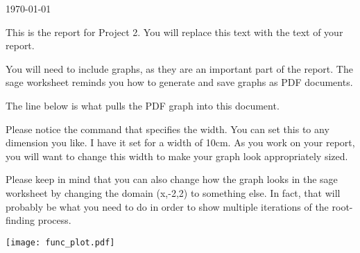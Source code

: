 \documentclass[11pt]{article}
\begin{document}
\today

\begin{report}
This is the report for Project 2. You will replace this text with the text of your report.

You will need to include graphs, as they are an important part of the report. The sage worksheet reminds you how to generate and save graphs as PDF documents.

The line below is what pulls the PDF graph into this document.

Please notice the command that specifies the width. You can set this to any dimension you like. I have it set for a width of 10cm. As you work on your report, you will want to change this width to make your graph look appropriately sized.

Please keep in mind that you can also change how the graph looks in the sage worksheet by changing the domain (x,-2,2) to something else. In fact, that will probably be what you need to do in order to show multiple iterations of the root-finding process.

\texttt{[image: func\_plot.pdf]}

\end{report}
\end{document}
